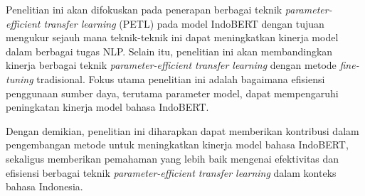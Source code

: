 Penelitian ini akan difokuskan pada penerapan berbagai teknik \textit{parameter-efficient transfer learning} (PETL) pada model IndoBERT dengan tujuan mengukur sejauh mana teknik-teknik ini dapat meningkatkan kinerja model dalam berbagai tugas NLP. Selain itu, penelitian ini akan membandingkan kinerja berbagai teknik \textit{parameter-efficient transfer learning} dengan metode \textit{fine-tuning} tradisional. Fokus utama penelitian ini adalah bagaimana efisiensi penggunaan sumber daya, terutama parameter model, dapat mempengaruhi peningkatan kinerja model bahasa IndoBERT.

Dengan demikian, penelitian ini diharapkan dapat memberikan kontribusi dalam pengembangan metode untuk meningkatkan kinerja model bahasa IndoBERT, sekaligus memberikan pemahaman yang lebih baik mengenai efektivitas dan efisiensi berbagai teknik \textit{parameter-efficient transfer learning} dalam konteks bahasa Indonesia.